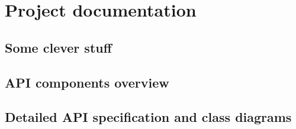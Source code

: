 
\chapter{Project documentation} \label{chap:docs}

\bt

\section{Some clever stuff} \label{sec:cuda}

\bt

\section{API components overview} \label{sec:api-overview}

\section{Detailed API specification and class diagrams} \label{sec:api-detail}
